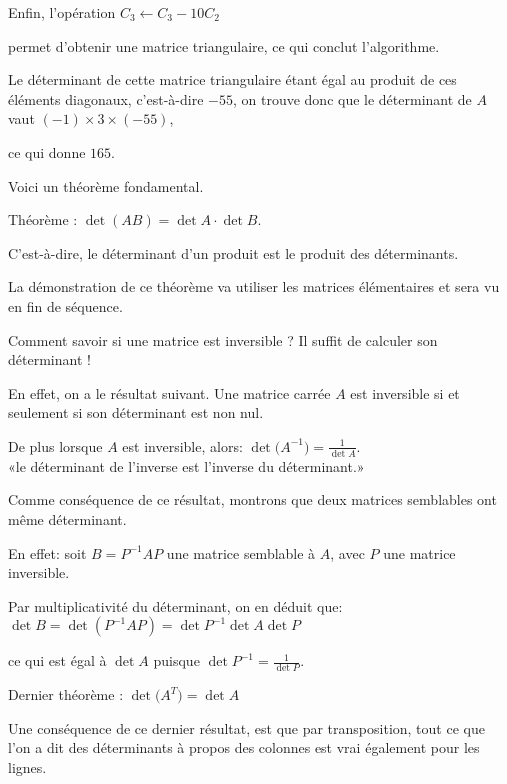 \change
Enfin, l'opération $C_3 \leftarrow C_3-10C_2 $

\change
permet d'obtenir une matrice triangulaire, ce qui conclut l'algorithme.

\change
Le déterminant de cette matrice triangulaire étant égal au produit de ces éléments diagonaux, c'est-à-dire $-55$, on trouve donc que le déterminant de $A$ vaut $ (-1)\times 3 \times (-55)$,

\change
ce qui donne $165$.

\diapo

Voici un théorème fondamental.

Théorème :  $\det (AB)=\det A \cdot \det B$.

C'est-à-dire, le déterminant d'un produit est le produit des déterminants.

La démonstration de ce théorème va utiliser les matrices élémentaires et sera vu en fin de séquence.

\diapo
Comment savoir si une matrice est inversible ? Il suffit de calculer son déterminant !

En effet, on a le résultat suivant. Une matrice carrée $A$ est inversible si et seulement si son
déterminant est non nul. 

\change
De plus lorsque $A$ est inversible,  
alors:  $\displaystyle \det \big(A^{-1}\big)=\frac1{\det A}$.\\

«le déterminant de l'inverse est l'inverse du déterminant.»

\change
Comme conséquence de ce résultat, montrons que deux  matrices semblables ont même déterminant. 

\change
En effet: soit $B=P^{-1}AP$ une matrice semblable à $A$, avec $P$ une matrice inversible. 

\change
Par multiplicativité du déterminant, on en déduit que:
$\det B=\det (P^{-1}AP)=\det P^{-1}\det A\det P$

\change
ce qui est égal à $\det A$ puisque $\det P^{-1}=\frac{1}{\det P}$.

\diapo

Dernier théorème : $\det \big(A^T\big)=\det A$

\change
Une conséquence de ce dernier résultat, est que par transposition, tout ce que l'on a 
dit des déterminants à propos des colonnes est 
vrai également pour les lignes. 

